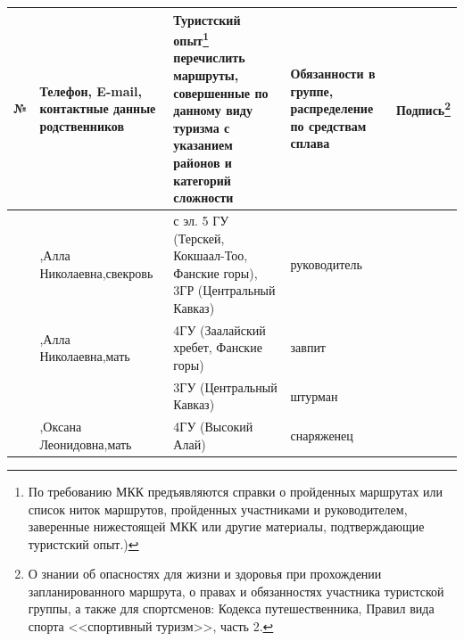 \documentclass[a5paper, 12pt, twoside]{article}
\begin{document}
\newpage %

        \renewcommand{\myfootnotetext}{\tiny По требованию МКК предъявляются справки о пройденных
        маршрутах или список ниток маршрутов, пройденных участниками и руководителем, заверенные
        нижестоящей МКК или другие материалы, подтверждающие туристский опыт.)}
        
        \newcommand{\myfootnotetextt}{\tiny О знании об опасностях для жизни и здоровья при прохождении
        запланированного маршрута, о правах и обязанностях участника туристской группы, а также для
        спортсменов: Кодекса путешественника, Правил вида спорта <<спортивный туризм>>, часть 2.}

        \renewcommand{\arraystretch}{2}
        {\scriptsize%
        \begin{longtable}{%
            |>{\centering\arraybackslash} m{0.5cm}%
            |>{\centering\arraybackslash} m{2.9cm}%
            |>{\centering\arraybackslash} m{4.9cm}%
            |>{\centering\arraybackslash} m{3.2cm}%
            |>{\centering\arraybackslash} m{1.5cm}|}
            \hline
            \rowcolor{Gray}
            № & Телефон, E-mail, контактные данные родственников        & Туристский опыт\footnote{\myfootnotetext} {\tiny перечислить маршруты, совершенные по данному виду туризма с указанием районов и категорий сложности} & Обязанности в группе, распределение по средствам сплава &   Подпись\footnote{\myfootnotetextt}  \\ \hline
            1 & 79775206991,\newline Алла Николаевна,\newline свекровь  & 4 с эл. 5 ГУ (Терскей, Кокшаал-Тоо, Фанские горы), 3ГР (Центральный Кавказ) & руководитель            &\rule{0cm}{1.2cm} \\ \hline
            2 & 79775206991,\newline Алла Николаевна,\newline мать      & 4ГУ (Заалайский хребет, Фанские горы)                                       & завпит                  &\rule{0cm}{1.2cm} \\ \hline
            3 &                                                         & 3ГУ (Центральный Кавказ)                                                    & штурман                 &\rule{0cm}{1.2cm} \\ \hline
            4 & 79166867285,\newline Оксана Леонидовна,\newline мать    & 4ГУ (Высокий Алай)                                                          & снаряженец              &\rule{0cm}{1.2cm} \\ \hline

\end{longtable}}
\end{document}
